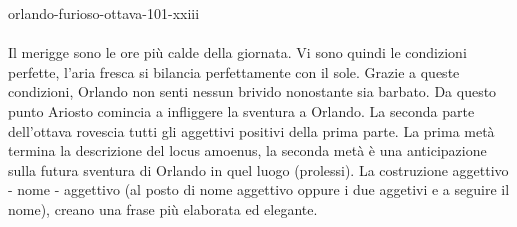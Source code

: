\documentclass[preview]{standalone}
\begin{document}
\begin{snippet}{orlando-furioso-ottava-101-xxiii}
    \\\\
    Il merigge sono le ore più calde della giornata.
    Vi sono quindi le condizioni perfette, l'aria fresca si bilancia perfettamente con il sole.
    Grazie a queste condizioni, Orlando non senti nessun brivido nonostante sia barbato.
    Da questo punto Ariosto comincia a infliggere la sventura a Orlando.
    La seconda parte dell'ottava rovescia tutti gli aggettivi positivi della prima parte.
    La prima metà termina la descrizione del locus amoenus, la seconda metà è una anticipazione
    sulla futura sventura di Orlando in quel luogo (prolessi).
    La costruzione aggettivo - nome - aggettivo (al posto di nome aggettivo oppure i due aggetivi
    e a seguire il nome), creano una frase più elaborata ed elegante.
\end{snippet}
\end{document}
